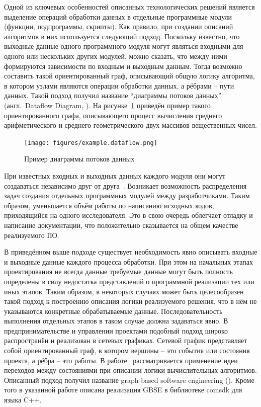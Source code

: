 Одной из ключевых особенностей описанных технологических решений является выделение операций обработки данных в отдельные программные модули (функции, подпрограммы, скрипты). Как правило, при создании описаний алгоритмов в них используется следующий подход. Поскольку известно, что выходные данные одного программного модуля могут являться входными для одного или нескольких других модулей, можно сказать, что между ними формируются зависимости по входным и выходным данным. Тогда возможно составить такой ориентированный граф, описывающий общую логику алгоритма, в котором узлами являются операции обработки данных, а рёбрами -- пути данных. Такой подход получил название ``диаграммы потоков данных'' (англ.~Dataflow Diagram, ). На рисунке~\ref{fig:exampleDataflow} приведён пример такого ориентированного графа, описывающего процесс вычисления среднего арифметического и среднего геометрического двух массивов вещественных чисел.
\begin{figure}
  \centering
  \texttt{[image: figures/example.dataflow.png]}
  \caption{Пример диаграммы потоков данных}
  \label{fig:exampleDataflow}
\end{figure}

При известных входных и выходных данных каждого модуля они могут создаваться независимо друг от друга~\cite{DanilovPar2011}. Возникает возможность распределения задач создания отдельных программных модулей между разработчиками. Таким образом, уменьшается объём работы по написанию исходных кодов, приходящийся на одного исследователя. Это в свою очередь облегчает отладку и написание документации, что положительно сказывается на общем качестве реализуемого ПО.

В приведённом выше подходе существует необходимость явно описывать входные и выходные данные каждого процесса обработки. При этом на начальных этапах проектирования не всегда данные требуемые данные могут быть полность определены в силу недостатка представлений о программной реализации тех или иных этапов. Таким образом, в некоторых случаях может быть целесообразен такой подход к построению описания логики реализуемого решения, что в нём не указываются конкретные обрабатываемые данные. Последовательность выполнения отдельных этапов в таком случае должна задаваться явно. В предпринимательстве и управлении проектами подобный подход широко распространён и реализован в сетевых графиках. Сетевой график представляет собой ориентированный граф, в котором вершины -- это события или состояния проекта, а рёбра -- это работы. В работе~\cite{SokolovPershin2018} рассматривается применение идеи переходов между состояниями при описании логики вычислительных алгоритмов. Описанный подход получил название graph-based software engineering (). Кроме того в указанной работе описана реализация GBSE в библиотеке comsdk для языка C++.

